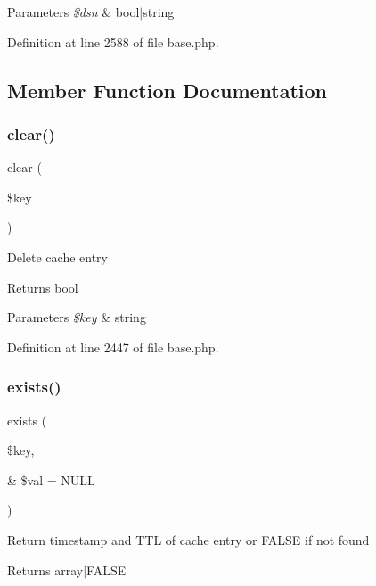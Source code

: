 \begin{DoxyParams}{Parameters}
{\em \$dsn} & bool$\vert$string \\
\hline
\end{DoxyParams}


Definition at line 2588 of file base.\+php.



\subsection{Member Function Documentation}
\hypertarget{class_cache_a10a949ef75de6c82c98ac555f371ba83}{}\label{class_cache_a10a949ef75de6c82c98ac555f371ba83} 
\subsubsection{\texorpdfstring{clear()}{clear()}}
{\footnotesize\ttfamily clear (\begin{DoxyParamCaption}\item[{}]{\$key }\end{DoxyParamCaption})}

Delete cache entry \begin{DoxyReturn}{Returns}
bool 
\end{DoxyReturn}

\begin{DoxyParams}{Parameters}
{\em \$key} & string \\
\hline
\end{DoxyParams}


Definition at line 2447 of file base.\+php.

\hypertarget{class_cache_a28497caad131119319e31168c38713b6}{}\label{class_cache_a28497caad131119319e31168c38713b6} 
\subsubsection{\texorpdfstring{exists()}{exists()}}
{\footnotesize\ttfamily exists (\begin{DoxyParamCaption}\item[{}]{\$key,  }\item[{\&}]{\$val = {\ttfamily NULL} }\end{DoxyParamCaption})}

Return timestamp and T\+TL of cache entry or F\+A\+L\+SE if not found \begin{DoxyReturn}{Returns}
array$\vert$\+F\+A\+L\+SE 
\end{DoxyReturn}

